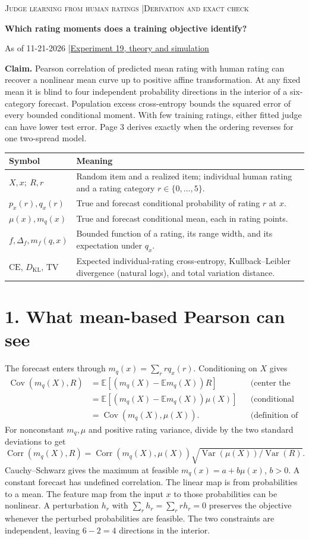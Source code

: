 \documentclass[11pt]{article}
\newcommand{\E}{\mathbb E}\newcommand{\Var}{\operatorname{Var}}\newcommand{\Cov}{\operatorname{Cov}}
\newcommand{\Corr}{\operatorname{Corr}}\newcommand{\KL}{D_{\mathrm{KL}}}
\newcommand{\TV}{\mathrm{TV}}\newcommand{\CE}{\mathrm{CE}}
\def\expurl{https://github.com/brando90/judges-dont-need-psychometrics-or-corr/tree/main/experiments/19_small_data_moment_recovery_open_and_closed_judges_start_21Nov2026}
\begin{document}
{\small\scshape Judge learning from human ratings \quad|\quad Derivation and exact check}\par
{\LARGE\bfseries Which rating moments does a training objective identify?}\par
{\small As of 11-21-2026 \quad|\quad \href{\expurl/theory_simulation}{Experiment 19, theory and simulation}}\par
\textbf{Claim.} Pearson correlation of predicted mean rating with human rating can recover a nonlinear mean curve up to positive affine transformation. At any fixed mean it is blind to four independent probability directions in the interior of a six-category forecast. Population excess cross-entropy bounds the squared error of every bounded conditional moment. With few training ratings, either fitted judge can have lower test error. Page 3 derives exactly when the ordering reverses for one two-spread model.

\begin{tabularx}{\linewidth}{@{}lX@{}}
\toprule Symbol & Meaning \\ \midrule
$X,x;\ R,r$ & Random item and a realized item; individual human rating and a rating category $r\in\{0,\ldots,5\}$.\\
$p_x(r),q_x(r)$ & True and forecast conditional probability of rating $r$ at $x$.\\
$\mu(x),m_q(x)$ & True and forecast conditional mean, each in rating points.\\
$f,\Delta_f,m_f(q,x)$ & Bounded function of a rating, its range width, and its expectation under $q_x$.\\
$\CE,\,\KL,\,\TV$ & Expected individual-rating cross-entropy, Kullback--Leibler divergence (natural logs), and total variation distance.\\
\bottomrule
\end{tabularx}

\section*{1. What mean-based Pearson can see}
The forecast enters through $m_q(x)=\sum_r r q_x(r)$. Conditioning on $X$ gives
\begin{align*}
\Cov(m_q(X),R)&=\E[(m_q(X)-\E m_q(X))R] &&\text{(center the first factor)}\\
 &=\E[(m_q(X)-\E m_q(X))\mu(X)] &&\text{(conditional expectation)}\\
 &=\Cov(m_q(X),\mu(X)). &&\text{(definition of covariance)}
\end{align*}
For nonconstant $m_q,\mu$ and positive rating variance, divide by the two standard deviations to get
\[
\boxed{\Corr(m_q(X),R)=\Corr(m_q(X),\mu(X))\sqrt{\Var(\mu(X))/\Var(R)}.}
\]
Cauchy--Schwarz gives the maximum at feasible $m_q(x)=a+b\mu(x)$, $b>0$. A constant forecast has undefined correlation. The linear map is from probabilities to a mean. The feature map from the input $x$ to those probabilities can be nonlinear. A perturbation $h_r$ with $\sum_r h_r=\sum_r rh_r=0$ preserves the objective whenever the perturbed probabilities are feasible. The two constraints are independent, leaving $6-2=4$ directions in the interior.
\end{document}
